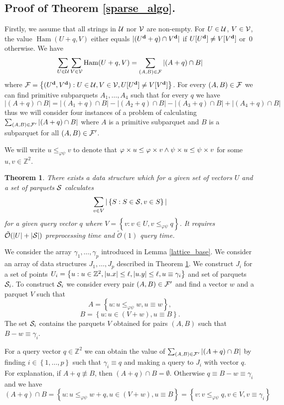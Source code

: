 \documentclass[11pt]{article}
\newcommand{\Z}{\mathbb{Z}}
\newcommand{\tO}{\tilde{\mathcal{O}}}
\renewcommand{\phi}{\varphi}
\newcommand{\set}[1]{\left\lbrace #1 \right\rbrace}
\DeclareMathOperator*{\Ham}{Ham}
\theoremstyle{plain}
\newtheorem{theorem}{Theorem}
\theoremstyle{definition}
\theoremstyle{remark}
\begin{document}
\subsection{Proof of Theorem \ref{sparse_algo}.}

Firstly, we assume that all strings in $\U$ nor $\V$ are non-empty.
For $U \in \U$, $V \in \V$, the value $ \Ham(U + q, V)$ either equals $|(\d{U} + q) \cap \d{V}|$ if $U[\d{U}] \neq V[\d{V}]$ or~$0$ otherwise.
We have
$$ \sum_{U \in \U} \sum_{V \in \V} \Ham(U + q, V) = \sum_{(A, B) \in \F} |(A + q) \cap B| $$
where $ \F = \set{(\d{U}, \d{V}) : U \in \U, V \in \V, U[\d{U}] \neq V[\d{V}]} $. 
For every $(A, B) \in \F$ we can find primitive subparquets $A_1, \dots, A_4$ such that for every $q$ we have
$$ |(A + q) \cap B| = |(A_1 + q) \cap B| - |(A_2 + q) \cap B| - |(A_3 + q) \cap B| + |(A_4 + q) \cap B| $$
thus we will consider four instances of a problem of calculating $\sum_{(A, B) \in \F'} |(A + q) \cap B|$ where $A$ is a primitive subparquet and $B$ is a subparquet for all $(A, B) \in \F'$.

We will write $u \le_{\phi\psi} v$ to denote that $\h{u} \le \h{v} \wedge \s{u} \le \s{v}$ for some $u, v \in \Z^2$.

\begin{theorem}\label{sweeper}
	There exists a data structure which for a given set of vectors $U$ and a set of parquets $\S$ calculates
	$$ \sum_{v \in V} |\set{S : S \in \S, v \in S}| $$
	for a given query vector $q$ where $V = \set{v : v \in U, v \le_{\phi\psi} q}$.
	It requires $\tO(|U| + |\S|)$ preprocessing time and $\tO(1)$ query time.
\end{theorem}

We consider the array $\gamma_1, \dots, \gamma_p$ introduced in Lemma \ref{lattice_base}.
We consider an array of data structures $J_1, \dots, J_p$ described in Theorem \ref{sweeper}.
We construct $J_i$ for a set of points $U_i = \set{u : u \in \Z^2, |\x{u}| \le \ell, |\y{u}| \le \ell, u \equiv \gamma_i}$ and set of parquets $\S_i$.
To construct $\S_i$ we consider every pair $(A, B) \in \F'$ and find a vector $w$ and a parquet $V$ such that 
$$ A = \set{u : u \le_{\phi\psi} w, u \equiv w},$$
$$ B = \set{u : u \in (V + w), u \equiv B}.$$
The set $\S_i$ contains the parquets $V$ obtained for pairs $(A, B)$ such that $B - w \equiv \gamma_i$.

For a query vector $q \in \Z^2$ we can obtain the value of $\sum_{(A, B) \in \F'} |(A + q) \cap B|$ by finding $i \in \set{1, \dots, p}$ such that $\gamma_i \equiv q$ and making a query to $J_i$ with vector $q$. 
For explanation, if $A + q \not \equiv B$, then $(A + q) \cap B = \emptyset$.
Otherwise $q \equiv B - w \equiv \gamma_i$ and we have
$$ (A + q) \cap B = \set{u : u \le_{\phi\psi} w + q, u \in (V + w), u \equiv B} = \set{v : v \le_{\phi\psi} q, v \in V, v \equiv \gamma_i} $$
\end{document}

